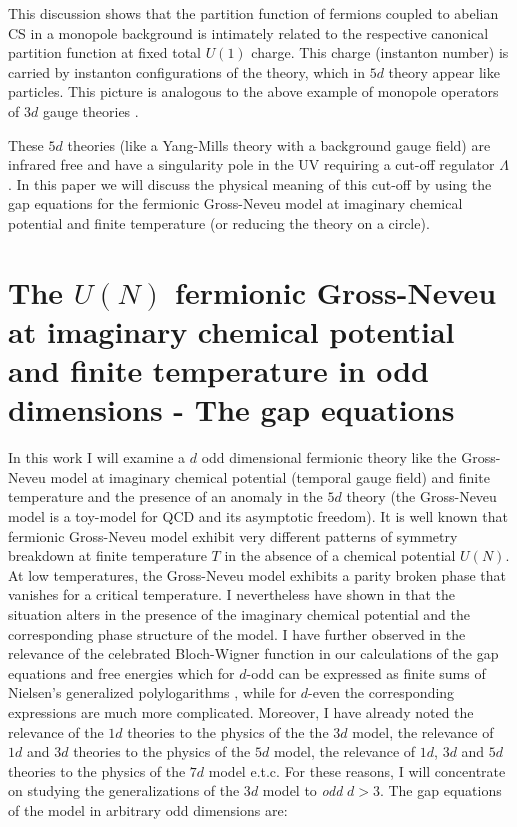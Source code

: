 \documentclass[twoside]{article}
\begin{document}
This discussion shows that the partition function of fermions coupled to abelian CS in a monopole background is intimately related to the respective canonical partition function at fixed total $U(1)$ charge. This charge (instanton number) is carried by instanton configurations of the theory, which in $5d$ theory appear like particles. This picture is analogous to the above example of monopole operators of $3d$ gauge theories \cite{Genolini}. 

These $5d$ theories (like a Yang-Mills theory with a background gauge field) are infrared free and have a singularity pole in the UV requiring a cut-off regulator $\Lambda$. In this paper we will discuss the physical meaning of this cut-off by using the gap equations for the fermionic Gross-Neveu model at imaginary chemical potential and finite temperature (or reducing the theory on a circle). 


\section{The $U(N)$ fermionic Gross-Neveu at imaginary chemical potential and finite temperature in odd dimensions - The gap equations}

In this work I will examine a $d$ odd dimensional fermionic theory like the Gross-Neveu model at imaginary chemical potential (temporal gauge field) and finite temperature and the presence of an anomaly in the $5d$ theory (the Gross-Neveu model is a toy-model for QCD and its asymptotic freedom). It is well known that fermionic Gross-Neveu model exhibit very different patterns of symmetry breakdown at finite temperature $T$ in the absence of a chemical potential $U(N)$. At low temperatures, the Gross-Neveu model exhibits a parity broken phase that vanishes for a critical temperature.
I nevertheless have shown in \cite{Filothodoros:2016txa} that the situation alters in the presence of the imaginary chemical potential and the corresponding phase structure of the model. I have further observed in \cite{Filothodoros:2016txa}  the relevance of the celebrated Bloch-Wigner function \cite{Zagier1} in our calculations of the gap equations and free energies which for $d$-odd can be expressed as finite sums of Nielsen's generalized polylogarithms \cite{Filothodoros:2016txa, Borwein,Kolbig}, while for $d$-even the corresponding expressions are much more complicated. Moreover, I have already noted the relevance of the $1d$ theories to the physics of the the $3d$ model, the relevance of $1d$ and $3d$ theories to the physics of the $5d$ model, the relevance of $1d$, $3d$ and $5d$ theories to the physics of the $7d$ model e.t.c. For these reasons, I will concentrate on studying the generalizations of the 3$d$ model to {\it odd} $d>3$.
The gap equations of the model in arbitrary odd dimensions are:
\end{document}
